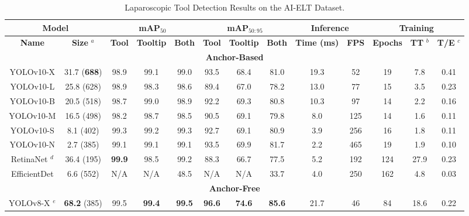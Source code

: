 \footnotesize
\begin{table}[htbp]
    \centering
    \caption{Laparoscopic Tool Detection Results on the AI-ELT Dataset.}
    \vspace*{-3mm}
    \label{fig:modelresults}
    \begin{tabular}{|c|c|c|c|c|c|c|c|c|c|c|c|c|}
    \hline
    \multicolumn{2}{|c|}{\textbf{Model}} & \multicolumn{3}{c|}{\textbf{mAP$_{50}$}} & \multicolumn{3}{c|}{\textbf{mAP$_{50:95}$}} & \multicolumn{2}{c|}{\textbf{Inference}} & \multicolumn{3}{c|}{\textbf{Training}} \\
    \hline
    \textbf{Name} & \textbf{Size} $^a$ & \textbf{Tool} & \textbf{Tooltip} & \textbf{Both} & \textbf{Tool} & \textbf{Tooltip} & \textbf{Both} & \textbf{Time (ms)} & \textbf{FPS} & \textbf{Epochs} & \textbf{TT} $^b$ & \textbf{T/E} $^c$ \\ 
    \hline
    \multicolumn{13}{|c|}{\textbf{Anchor-Based}} \\
    \hline
    YOLOv10-X & 31.7 (\textbf{688}) & 98.9 & 99.1 & 99.0 & 93.5 & 68.4 & 81.0 & 19.3 & 52 & 19 & 7.8 & 0.41 \\ 
    YOLOv10-L & 25.8 (628) & 98.9 & 98.3 & 98.6 & 89.4 & 67.0 & 78.2 & 13.0 & 77 & 15 & 3.5 & 0.23 \\ 
    YOLOv10-B & 20.5 (518) & 98.7 & 99.0 & 98.9 & 92.2 & 69.3 & 80.8 & 10.3 & 97 & 14 & 2.2 & 0.16 \\ 
    YOLOv10-M & 16.5 (498) & 98.2 & 98.7 & 98.5 & 90.5 & 69.1 & 79.8 & 8.0 & 125 & 14 & 1.6 & 0.11 \\ 
    YOLOv10-S & 8.1 (402) & 99.3 & 99.2 & 99.3 & 92.7 & 69.1 & 80.9 & 3.9 & 256 & 16 & 1.8 & 0.11 \\ 
    YOLOv10-N & 2.7 (385) & 99.1 & 99.1 & 99.1 & 93.5 & 69.9 & 81.7 & 2.2 & 465 & 19 & 1.9 & 0.10 \\ 
    RetinaNet $^d$ & 36.4 (195) & \textbf{99.9} & 98.5 & 99.2 & 88.3 & 66.7 & 77.5 & 5.2 & 192 & 124 & 27.9 & 0.23 \\ 
    EfficientDet & 6.6 (552) & N/A & N/A & 48.5 & N/A & N/A & 33.7 & 4.0 & 250 & 162 & 4.8 & 0.03 \\ 
    \hline
    \multicolumn{13}{|c|}{\textbf{Anchor-Free}} \\
    \hline
    \rowcolor{yellow} YOLOv8-X $^e$ & \textbf{68.2} (385) & 99.5 & \textbf{99.4} & \textbf{99.5} & \textbf{96.6} & \textbf{74.6} & \textbf{85.6} & 21.7 & 46 & 84 & 18.6 & 0.22 \\ 

\end{tabular}
\end{table}
